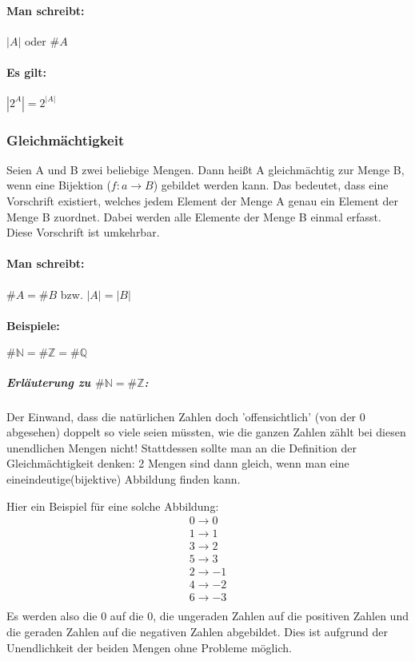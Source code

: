\documentclass[a4paper,12pt, DIV12]{scrartcl}
\begin{document}
\paragraph{Man schreibt:}
\({}|{}A{}|{}\) oder \(\#A\)
\paragraph{Es gilt:}
\begin{math}
{}|{}2^A{}|{} = 2^{{}|{}A{}|{}}
\end{math}
\subsubsection*{Gleichmächtigkeit}
Seien A und B zwei beliebige Mengen.
Dann heißt A gleichmächtig zur Menge B, wenn eine Bijektion (\({f:a}\rightarrow{B}\)) gebildet
werden kann. Das bedeutet, dass eine Vorschrift existiert, welches
jedem Element der Menge A genau ein Element der Menge B zuordnet.
Dabei werden alle Elemente der Menge B einmal erfasst. Diese
Vorschrift ist umkehrbar.
\paragraph{Man schreibt:} \(\#A = \#B\) bzw. \(|A| = |B|\)
\paragraph*{Beispiele:}
\begin{math}
\#{\mathbb N} = \#{\mathbb Z} = \#{\mathbb Q}
\end{math}
\subparagraph{Erläuterung zu \(\#{\mathbb N} = \#{\mathbb Z}\):}
Der Einwand, dass die natürlichen Zahlen doch 'offensichtlich' (von der 0 abgesehen) doppelt so viele seien müssten, wie die ganzen Zahlen zählt bei diesen unendlichen Mengen nicht!
Stattdessen sollte man an die Definition der Gleichmächtigkeit denken: 2 Mengen sind dann gleich, wenn man eine eineindeutige(bijektive) Abbildung finden kann.

Hier ein Beispiel für eine solche Abbildung:
\begin{align*}
0 \rightarrow 0  \\
1 \rightarrow 1  \\
3 \rightarrow 2  \\
5 \rightarrow 3  \\
2 \rightarrow -1 \\
4 \rightarrow -2 \\
6 \rightarrow -3 \\
\end{align*}
Es werden also die 0 auf die 0, die ungeraden Zahlen auf die positiven Zahlen und die geraden Zahlen auf die negativen Zahlen abgebildet. Dies ist aufgrund der Unendlichkeit der beiden Mengen ohne Probleme möglich.
\end{document}
